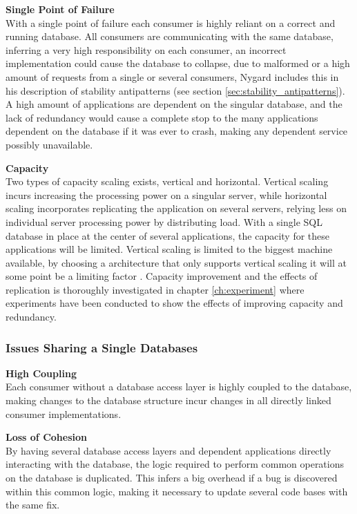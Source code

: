 {\textbf{Single Point of Failure}\\
With a single point of failure each consumer is highly reliant on a correct and running database. All consumers are communicating with the same database, inferring a very high responsibility on each consumer, an incorrect implementation could cause the database to collapse, due to malformed or a high amount of requests from a single or several consumers, Nygard includes this in his description of stability antipatterns \cite[p. 31]{nygard2007release}  (see section \ref{sec:stability_antipatterns}).
A high amount of applications are dependent on the singular database, and the lack of redundancy would cause a complete stop to the many applications dependent on the database if it was ever to crash, making any dependent service possibly unavailable.

\textbf{Capacity}\\
Two types of capacity scaling exists, vertical and horizontal. Vertical scaling incurs increasing the processing power on a singular server, while horizontal scaling incorporates replicating the application on several servers, relying less on individual server processing power by distributing load. With a single SQL database in place at the center of several applications, the capacity for these applications will be limited. Vertical scaling is limited to the biggest machine available, by choosing a architecture that only supports vertical scaling it will at some point be a limiting factor \cite[t.~08:30]{meshenberg2016microservices}.
Capacity improvement and the effects of replication is thoroughly investigated in chapter \ref{ch:experiment} where experiments have been conducted to show the effects of improving capacity and redundancy.

\subsubsection{Issues Sharing a Single Databases}

\textbf{High Coupling}\\
Each consumer without a database access layer is highly coupled to the database, making changes to the database structure incur changes in all directly linked consumer implementations.

\textbf{Loss of Cohesion}\\
By having several database access layers and dependent applications directly interacting with the database, the logic required to perform common operations on the database is duplicated. This infers a big overhead if a bug is discovered within this common logic, making it necessary to update several code bases with the same fix.

}
